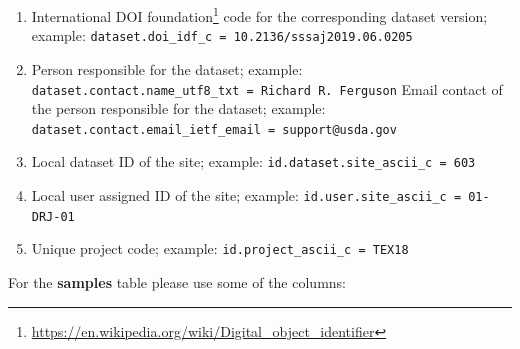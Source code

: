\documentclass[
  graybox,natbib,nospthms]{svmono}
\renewcommand{\href}[2]{#2 (\url{#1})}
\renewcommand{\href}[2]{#2\footnote{\url{#1}}}
\begin{document}
\begin{enumerate}
  Data license URL for the dataset; example: \texttt{dataset.license.address\_idn\_url\ =\ \textquotesingle{}https://creativecommons.org/share-your-work/public-domain/cc0/\textquotesingle{}}\\
\item
  \href{https://en.wikipedia.org/wiki/Digital_object_identifier}{International DOI foundation} code for the corresponding dataset version; example: \texttt{dataset.doi\_idf\_c\ =\ \textquotesingle{}10.2136/sssaj2019.06.0205\textquotesingle{}}\\
\item
  Person responsible for the dataset; example: \texttt{dataset.contact.name\_utf8\_txt\ =\ \textquotesingle{}Richard\ R.\ Ferguson\textquotesingle{}}
  Email contact of the person responsible for the dataset; example: \texttt{dataset.contact.email\_ietf\_email\ =\ \textquotesingle{}support@usda.gov\textquotesingle{}}\\
\item
  Local dataset ID of the site; example: \texttt{id.dataset.site\_ascii\_c\ =\ \textquotesingle{}603\textquotesingle{}}\\
\item
  Local user assigned ID of the site; example: \texttt{id.user.site\_ascii\_c\ =\ \textquotesingle{}01-DRJ-01\textquotesingle{}}\\
\item
  Unique project code; example: \texttt{id.project\_ascii\_c\ =\ \textquotesingle{}TEX18\textquotesingle{}}\\
\end{enumerate}

For the \textbf{samples} table please use some of the columns:
\end{document}
